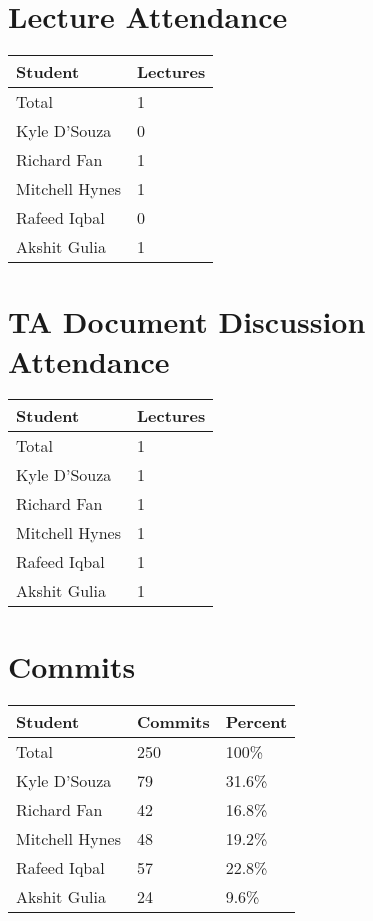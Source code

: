 \documentclass{article}
\begin{document}
\section{Lecture Attendance}

\begin{table}[H]
  \centering
  \begin{tabular}{ll}
    \toprule
    \textbf{Student} & \textbf{Lectures}\\
    \midrule
    Total & 1\\
    Kyle D'Souza & 0\\
    Richard Fan & 1\\
    Mitchell Hynes & 1\\
    Rafeed Iqbal & 0\\
    Akshit Gulia & 1\\
    \bottomrule
  \end{tabular}
\end{table}

\section{TA Document Discussion Attendance}

\begin{table}[H]
  \centering
  \begin{tabular}{ll}
    \toprule
    \textbf{Student} & \textbf{Lectures}\\
    \midrule
    Total & 1\\
    Kyle D'Souza & 1\\
    Richard Fan & 1\\
    Mitchell Hynes & 1\\
    Rafeed Iqbal & 1\\
    Akshit Gulia & 1\\
    \bottomrule
  \end{tabular}
\end{table}

\section{Commits}

\begin{table}[H]
  \centering
  \begin{tabular}{lll}
    \toprule
    \textbf{Student} & \textbf{Commits} & \textbf{Percent}\\
    \midrule
    Total & 250 & 100\% \\
    Kyle D'Souza & 79 & 31.6\% \\
    Richard Fan & 42 & 16.8\% \\
    Mitchell Hynes & 48 & 19.2\% \\
    Rafeed Iqbal & 57 & 22.8\% \\
    Akshit Gulia & 24 & 9.6\% \\
    \bottomrule
  \end{tabular}
\end{table}
\end{document}
